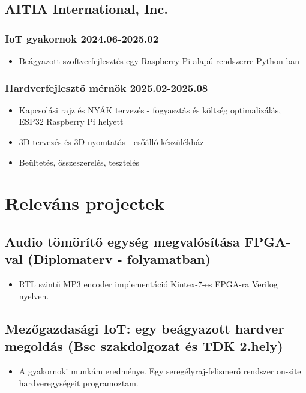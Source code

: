 \documentclass{article}
\newcommand{\rside}[1]{\hfill \normalfont\scshape\MakeLowercase{#1}}
\begin{document}
\subsection{AITIA International, Inc.}
\subsubsection{IoT gyakornok \rside{2024.06-2025.02}}
\begin{itemize}
  \item Beágyazott szoftverfejlesztés egy Raspberry Pi alapú rendszerre Python-ban
\end{itemize}
\subsubsection{Hardverfejlesztő mérnök \rside{2025.02-2025.08}}
\begin{itemize}
  \item Kapcsolási rajz és NYÁK tervezés - fogyasztás és költség optimalizálás, ESP32 Raspberry Pi helyett
  \item 3D tervezés és 3D nyomtatás - esőálló készülékház
  \item Beültetés, összeszerelés, tesztelés
\end{itemize}
\section{\faFlask\enspace Releváns projectek}
\subsection{Audio tömörítő egység megvalósítása FPGA-val (Diplomaterv - folyamatban)}
\begin{itemize}
  \item RTL szintű MP3 encoder implementáció Kintex-7-es FPGA-ra Verilog nyelven.
\end{itemize}

\subsection{Mezőgazdasági IoT: egy beágyazott hardver megoldás (Bsc szakdolgozat és TDK 2.hely)}
\begin{itemize}
  \item A gyakornoki munkám eredménye. Egy seregélyraj-felismerő rendszer on-site hardveregységeit programoztam.%
\end{itemize}
\end{document}
